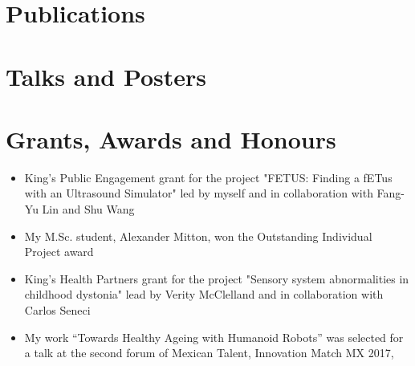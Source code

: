 \documentclass{mycv}
\begin{document}
\section{Publications}
\section{Talks and Posters}

\section{Grants, Awards and Honours}
\begin{itemize}
\item King's Public Engagement grant for the project "FETUS: Finding a fETus with an Ultrasound Simulator" led by myself and in collaboration with Fang-Yu Lin and Shu Wang \href{https://cai4cai.ml/post/2021-01-07-miguelpegrant/}{\faExternalLink*} 

\item My M.Sc. student, Alexander Mitton, won the Outstanding Individual Project award 
 \href{https://www.kcl.ac.uk/news/mscmres-healthcare-technologies-award-student-prizes-for-outstanding-performance-and-contributions-to-student-life}{\faExternalLink*} 

\item King's Health Partners grant for the project "Sensory system abnormalities in childhood dystonia" lead by Verity McClelland and in collaboration with Carlos Seneci \href{https://kclpure.kcl.ac.uk/portal/en/persons/miguel-angel-perez-xochicale(cca72683-31b7-496a-8aeb-181fd9d6a8f3)/projects.html}{\faExternalLink*} 

\item My work ``Towards Healthy Ageing with Humanoid Robots'' was selected for a talk at the second forum of Mexican Talent, Innovation Match MX 2017, \href{https://github.com/mxochicale/InnovationMatchMX/tree/master/2017}{\faExternalLink*} \href{https://github.com/mxochicale/InnovationMatchMX/blob/master/2017/presentation/IMMX-MA-0058.pdf}{\faFilePdf} \href{https://www.youtube.com/watch?v=wNWzpdXdm5U}{\faYoutube} 


\end{itemize}
\end{document}
